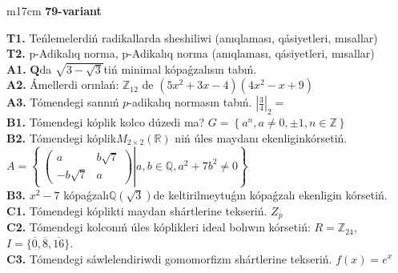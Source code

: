 \documentclass{article}
\begin{document}
\begin{tabular}{m{17cm}}
\textbf{79-variant}
\newline

\textbf{T1.} Teńlemelerdiń radikallarda sheshiliwi (anıqlaması, qásiyetleri, mısallar) \\
\textbf{T2.} p-Adikalıq norma, p-Adikalıq norma (anıqlaması, qásiyetleri, mısallar) \\
\textbf{A1.} \(\mathbf{Q}\)da \(\sqrt{3 - \sqrt{3}}\)tiń minimal kópaǵzalısın tabıń. \\
\textbf{A2.} Ámellerdi orınlań: \(\mathbb{Z}_{12}\) de \(\left( 5x^{2} + 3x - 4 \right)\left( 4x^{2} - x + 9 \right)\) \\
\textbf{A3.} Tómendegi sannıń \(p\)-adikalıq normasın tabıń. \(|\frac{3}{4}|_{2} =\) \\
\textbf{B1.} Tómendegi kóplik kolco dúzedi ma? \(G = \left\{ a^{n},a \neq 0, \pm 1,n \in \mathbb{Z} \right\}\) \\
\textbf{B2.} Tómendegi kóplik\(M_{2 \times 2}\left( \mathbb{R} \right)\) niń úles maydanı ekenliginkórsetiń. \(A = \left\{ \left. \ \begin{pmatrix}
a & b\sqrt{7} \\
 - b\sqrt{7} & a
\end{pmatrix} \right|a,b\mathbb{\in Q},a^{2} + 7b^{2} \neq 0 \right\}\) \\
\textbf{B3.} \(x^{2} - 7\) kópaǵzalı\(\mathbb{Q}(\sqrt{3})\)de keltirilmeytuǵın kópaǵzalı ekenligin kórsetiń. \\
\textbf{C1.} Tómendegi kóplikti maydan shártlerine tekseriń. \(Z_{p}\) \\
\textbf{C2.} Tómendegi kolconıń úles kóplikleri ideal bolıwın kórsetiń:
\(R = \mathbb{Z}_{24}\), \(I = \{\overline{0},\overline{8},\overline{16}\}\). \\
\textbf{C3.} Tómendegi sáwlelendiriwdi gomomorfizm shártlerine tekseriń. \(f(x) = e^{x}\) \\

\end{tabular}
\vspace{1cm}
\end{document}
